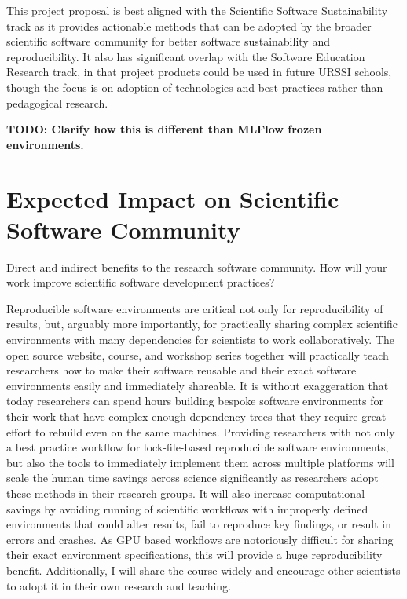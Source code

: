 \documentclass[letterpaper, 11pt]{article}
\newcommand{\program}{URSSI}
\begin{document}
This project proposal is best aligned with the Scientific Software Sustainability track as it provides actionable methods that can be adopted by the broader scientific software community for better software sustainability and reproducibility.
It also has significant overlap with the Software Education Research track, in that project products could be used in future \program{} schools, though the focus is on adoption of technologies and best practices rather than pedagogical research.

\textbf{TODO: Clarify how this is different than MLFlow frozen environments.}

\section{Expected Impact on Scientific Software Community}

Direct and indirect benefits to the research software community.
How will your work improve scientific software development practices?

Reproducible software environments are critical not only for reproducibility of results, but, arguably more importantly, for practically sharing complex scientific environments with many dependencies for scientists to work collaboratively.
The open source website, course, and workshop series together will practically teach researchers how to make their software reusable and their exact software environments easily and immediately shareable.
It is without exaggeration that today researchers can spend hours building bespoke software environments for their work that have complex enough dependency trees that they require great effort to rebuild even on the same machines.
Providing researchers with not only a best practice workflow for lock-file-based reproducible software environments, but also the tools to immediately implement them across multiple platforms will scale the human time savings across science significantly as researchers adopt these methods in their research groups.
It will also increase computational savings by avoiding running of scientific workflows with improperly defined environments that could alter results, fail to reproduce key findings, or result in errors and crashes.
As GPU based workflows are notoriously difficult for sharing their exact environment specifications, this will provide a huge reproducibility benefit.
Additionally, I will share the course widely and encourage other scientists to adopt it in their own research and teaching.
\end{document}
